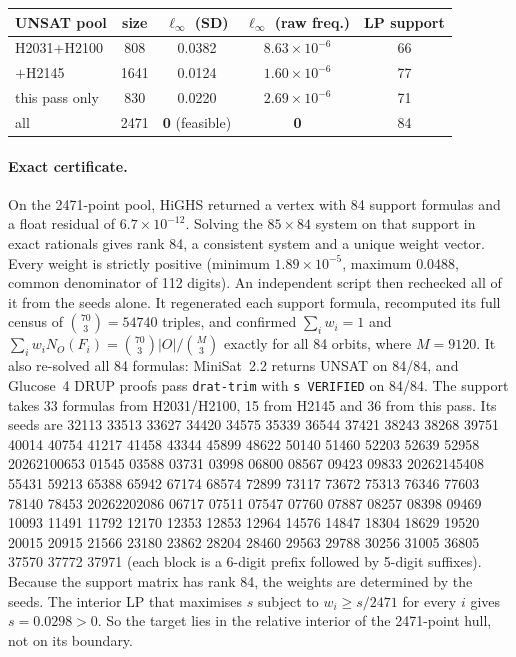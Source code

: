 \documentclass[11pt]{article}
\begin{document}
\begin{center}\begin{tabular}{lcccc}\toprule
UNSAT pool & size & $\ell_\infty$ (SD) & $\ell_\infty$ (raw freq.) & LP support\\\midrule
H2031+H2100 & 808 & 0.0382 & $8.63\times10^{-6}$ & 66\\
$+$H2145 & 1641 & 0.0124 & $1.60\times10^{-6}$ & 77\\
this pass only & 830 & 0.0220 & $2.69\times10^{-6}$ & 71\\
all & 2471 & \textbf{0} (feasible) & \textbf{0} & 84\\\bottomrule
\end{tabular}\end{center}

\paragraph{Exact certificate.} On the 2471-point pool, HiGHS returned a vertex with 84 support formulas and a float residual of $6.7\times10^{-12}$. Solving the $85\times84$ system on that support in exact rationals gives rank 84, a consistent system and a unique weight vector. Every weight is strictly positive (minimum $1.89\times10^{-5}$, maximum $0.0488$, common denominator of 112 digits). An independent script then rechecked all of it from the seeds alone. It regenerated each support formula, recomputed its full census of $\binom{70}{3}=54740$ triples, and confirmed $\sum_iw_i=1$ and $\sum_iw_iN_O(F_i)=\binom{70}{3}|O|/\binom{M}{3}$ exactly for all 84 orbits, where $M=9120$. It also re-solved all 84 formulas: MiniSat~2.2 returns UNSAT on 84/84, and Glucose~4 DRUP proofs pass \texttt{drat-trim} with \texttt{s VERIFIED} on 84/84. The support takes 33 formulas from H2031/H2100, 15 from H2145 and 36 from this pass. Its seeds are
{\small{} 32113 33513 33627 34420 34575 35339 36544 37421 38243 38268 39751 40014 40754 41217 41458 43344 45899 48622 50140 51460 52203 52639 52958 20262100653 01545 03588 03731 03998 06800 08567 09423 09833 20262145408 55431 59213 65388 65942 67174 68574 72899 73117 73672 75313 76346 77603 78140 78453 20262202086 06717 07511 07547 07760 07887 08257 08398 09469 10093 11491 11792 12170 12353 12853 12964 14576 14847 18304 18629 19520 20015 20915 21566 23180 23862 28204 28460 29563 29788 30256 31005 36805 37570 37772 37971}
(each block is a 6-digit prefix followed by 5-digit suffixes). Because the support matrix has rank 84, the weights are determined by the seeds. The interior LP that maximises $s$ subject to $w_i\ge s/2471$ for every $i$ gives $s=0.0298>0$. So the target lies in the relative interior of the 2471-point hull, not on its boundary.
\end{document}
